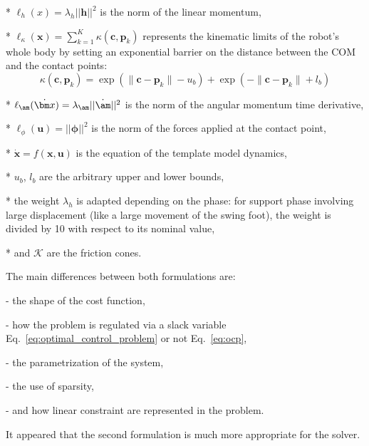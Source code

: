 \begin{list}{ .}{%
		\setlength{\topsep}{5pt}%
		\setlength{\itemsep}{0pt}%
		\setlength{\parsep}{0pt}%
		\setlength{\labelwidth}{3.em}%
		\setlength{\leftmargin}{2em}%
		\setlength{\labelsep}{0.5em}%
	}
\item[*] $\ell_h(x) = \lambda_h || \bm  h ||^2$ is the norm of the linear momentum,
\item[*] $\ell_\kappa(\bm x) = \sum_{k=1}^K \kappa(\bm c, \bm p_k)$ represents the kinematic limits of the robot's whole body by setting an exponential barrier on the distance between the COM and the contact points:
\begin{equation}
	\kappa (\bm c, \bm p_{k}) = 
	\exp(\|\bm c - \bm p_{k}\| - u_{b})
	+
	\exp(-\|\bm c - \bm p_{k}\| + l_{b})
\end{equation}
\item[*] $\ell_\am(\dot{\bm x}) = \lambda_\am || \dot \am ||^2$ is the norm of the angular momentum time derivative,
\item[*] $\ell_\phi(\bm u) = || \bm\phi ||^2$ is the norm of the forces applied at the contact point,
\item[*] $ \dot{\bm{x}} = f(\bm x, \bm u) $ is the equation of the template model dynamics,
\item[*] $u_{b}$, $l_{b}$ are the arbitrary upper and lower bounds,
\item[*] the weight $\lambda_h$ is adapted depending on the phase: for support phase involving large displacement (like a large movement of the swing foot), the weight is divided by 10 with respect to its nominal value,
\item[*] and $\mathcal{K}$ are the friction cones.
\end{list}

The main differences between both formulations are:
\begin{list}{ .}{%
		\setlength{\topsep}{5pt}%
		\setlength{\itemsep}{0pt}%
		\setlength{\parsep}{0pt}%
		\setlength{\labelwidth}{3.em}%
		\setlength{\leftmargin}{2em}%
		\setlength{\labelsep}{0.5em}%
	}
\item[-] the shape of the cost function,
\item[-] how the problem is regulated via a slack variable Eq.~\eqref{eq:optimal_control_problem} or not Eq.~\eqref{eq:ocp},
\item[-] the parametrization of the system,
\item[-] the use of sparsity,
\item[-] and how linear constraint are represented in the problem.
\end{list} 
It appeared that the second formulation is much more appropriate for the solver. 


